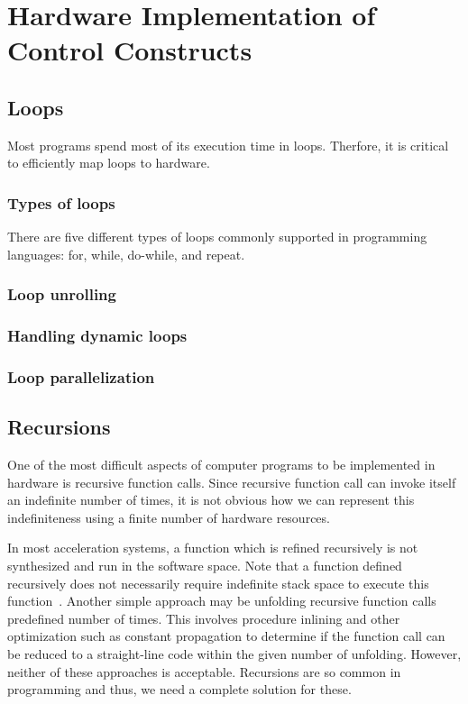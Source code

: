 \chapter{Hardware Implementation of Control Constructs}

\section{Loops}
Most programs spend most of its execution time in loops. Therfore, it is
critical to efficiently map loops to hardware.

\subsection{Types of loops}
There are five different types of loops commonly supported in programming
languages: for, while, do-while, and repeat.

\subsection{Loop unrolling}

\subsection{Handling dynamic loops}

\subsection{Loop parallelization}



\section{Recursions}
One of the most difficult aspects of computer programs to be implemented in
hardware is recursive function calls. Since recursive function call can
invoke itself an indefinite number of times, it is not obvious how we can
represent this indefiniteness using a finite number of hardware
resources. 

In most acceleration systems, a function which is refined recursively is not
synthesized and run in the software space. Note that a function defined
recursively does not necessarily require indefinite stack space to execute
this function~\cite{ASS96}. Another simple approach may be unfolding recursive
function calls predefined number of times. This involves procedure inlining
and other optimization such as constant propagation to determine if the
function call can be reduced to a straight-line code within the given number
of unfolding. However, neither of these approaches is acceptable. Recursions
are so common in programming and thus, we need a complete solution for these. 

